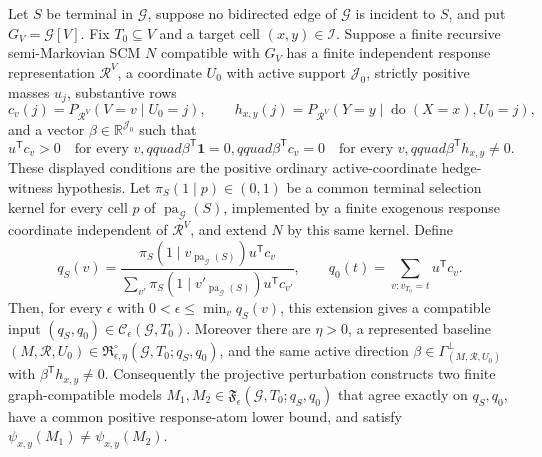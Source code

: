 Let \(S\) be terminal in \(\mathcal G\), suppose no bidirected edge of \(\mathcal G\) is incident to \(S\), and put \(G_V=\mathcal G[V]\).  Fix \(T_0\subseteq V\) and a target cell \((x,y)\in\mathcal I\).  Suppose a finite recursive semi-Markovian SCM \(N\) compatible with \(G_V\) has a finite independent response representation \(\mathcal R^{V}\), a coordinate \(U_0\) with active support \(\mathcal J_0\), strictly positive masses \(u_j\), substantive rows
\[
 c_v(j)=P_{\mathcal R^{V}}(V=v\mid U_0=j),
 \qquad
 h_{x,y}(j)=P_{\mathcal R^{V}}(Y=y\mid\operatorname{do}(X=x),U_0=j),
\]
and a vector \(\beta\in\mathbb R^{\mathcal J_0}\) such that
\[
 u^{\mathsf T}c_v>0\quad\text{for every }v,qquad
 \beta^{\mathsf T}\mathbf 1=0,qquad
 \beta^{\mathsf T}c_v=0\quad\text{for every }v,qquad
 \beta^{\mathsf T}h_{x,y}\neq0.
\]
These displayed conditions are the positive ordinary active-coordinate hedge-witness hypothesis.  Let \(\pi_S(1\mid p)\in(0,1)\) be a common terminal selection kernel for every cell \(p\) of \(\operatorname{pa}_{\mathcal G}(S)\), implemented by a finite exogenous response coordinate independent of \(\mathcal R^{V}\), and extend \(N\) by this same kernel.  Define
\[
 q_S(v)=
 \frac{\pi_S(1\mid v_{\operatorname{pa}_{\mathcal G}(S)})u^{\mathsf T}c_v}
 {\sum_{v'}\pi_S(1\mid v'_{\operatorname{pa}_{\mathcal G}(S)})u^{\mathsf T}c_{v'}},
 \qquad
 q_0(t)=\sum_{v:v_{T_0}=t}u^{\mathsf T}c_v.
\]
Then, for every \(\epsilon\) with \(0<\epsilon\leq\min_v q_S(v)\), this extension gives a compatible input \((q_S,q_0)\in\mathcal C_{\epsilon}(\mathcal G,T_0)\).  Moreover there are \(\eta>0\), a represented baseline \((M,\mathcal R,U_0)\in\mathfrak R_{\epsilon,\eta}^{\circ}(\mathcal G,T_0;q_S,q_0)\), and the same active direction \(\beta\in\Gamma_{(M,\mathcal R,U_0)}^{\perp}\) with \(\beta^{\mathsf T}h_{x,y}\neq0\).  Consequently the projective perturbation constructs two finite graph-compatible models \(M_1,M_2\in\mathfrak F_{\epsilon}(\mathcal G,T_0;q_S,q_0)\) that agree exactly on \(q_S,q_0\), have a common positive response-atom lower bound, and satisfy \(\psi_{x,y}(M_1)\neq\psi_{x,y}(M_2)\).